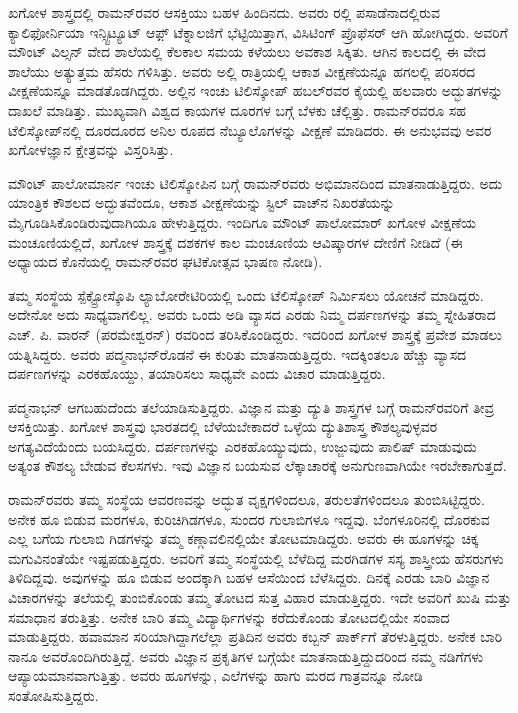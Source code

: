 ಖಗೋಳ ಶಾಸ್ತ್ರದಲ್ಲಿ ರಾಮನ್‌ರವರ ಆಸಕ್ತಿಯು ಬಹಳ ಹಿಂದಿನದು. ಅವರು  ರಲ್ಲಿ ಪಸಾಡೆನಾದಲ್ಲಿರುವ ಕ್ಯಾಲಿಫೋರ್ನಿಯಾ ಇನ್ಸ್ಟಿಟ್ಯೂಟ್ ಆಫ಼್ ಟೆಕ್ನಾಲಜಿಗೆ ಭೆಟ್ಟಿಯಿತ್ತಾಗ, ವಿಸಿಟಿಂಗ್ ಪ್ರೊಫೆಸರ್ ಆಗಿ ಹೋಗಿದ್ದರು. ಅವರಿಗೆ ಮೌಂಟ್ ವಿಲ್ಸನ್ ವೇದ ಶಾಲೆಯಲ್ಲಿ ಕೆಲಕಾಲ ಸಮಯ ಕಳೆಯಲು ಅವಕಾಶ ಸಿಕ್ಕಿತು. ಆಗಿನ ಕಾಲದಲ್ಲಿ ಈ ವೇದ ಶಾಲೆಯು ಅತ್ಯುತ್ತಮ ಹೆಸರು ಗಳಿಸಿತ್ತು. ಅವರು ಅಲ್ಲಿ ರಾತ್ರಿಯಲ್ಲಿ ಆಕಾಶ ವೀಕ್ಷಣೆಯನ್ನೂ ಹಗಲಲ್ಲಿ ಪರಿಸರದ ವೀಕ್ಷಣೆಯನ್ನೂ ಮಾಡತೊಡಗಿದ್ದರು. ಅಲ್ಲಿನ  ಇಂಚು ಟಿಲಿಸ್ಕೋಪ್ ಹಬಲ್‌ರವರ ಕೈಯಲ್ಲಿ ಹಲವಾರು ಅದ್ಭುತಗಳನ್ನು ದಾಖಲೆ ಮಾಡಿತ್ತು. ಮುಖ್ಯವಾಗಿ ವಿಶ್ವದ ಕಾಯಗಳ ದೂರಗಳ ಬಗ್ಗೆ ಬೆಳಕು ಚೆಲ್ಲಿತ್ತು. ರಾಮನ್‌ರವರೂ ಸಹ ಟೆಲಿಸ್ಕೋಪ್‌ನಲ್ಲಿ ದೂರ\enginline{-}ದೂರದ ಅನಿಲ ರೂಪದ ನೆಬ್ಯೂಲೊಗಳನ್ನು ವೀಕ್ಷಣೆ ಮಾಡಿದರು. ಈ ಅನುಭವವು ಅವರ ಖಗೋಳಜ್ಞಾನ ಕ್ಷೇತ್ರವನ್ನು ವಿಸ್ತರಿಸಿತ್ತು.

ಮೌಂಟ್ ಪಾಲೋಮಾರ್ನ  ಇಂಚು ಟಿಲಿಸ್ಕೋಪಿನ ಬಗ್ಗೆ ರಾಮನ್‌ರವರು ಅಭಿಮಾನದಿಂದ ಮಾತನಾಡುತ್ತಿದ್ದರು. ಅದು ಯಾಂತ್ರಿಕ ಕೌಶಲದ ಅದ್ಭುತವೆಂದೂ, ಆಕಾಶ ವೀಕ್ಷಣೆಯನ್ನು ಸ್ಟಿಲ್ ವಾಚ್‍ನ ನಿಖರತೆಯನ್ನು ಮೈಗೂಡಿಸಿಕೊಂಡಿರುವುದಾಗಿಯೂ ಹೇಳುತ್ತಿದ್ದರು. ಇಂದಿಗೂ ಮೌಂಟ್ ಪಾಲೋಮಾರ್ ಖಗೋಳ ವೀಕ್ಷಣೆಯ ಮಂಚೂಣಿಯಲ್ಲಿದೆ, ಖಗೋಳ ಶಾಸ್ತ್ರಕ್ಕೆ ದಶಕಗಳ ಕಾಲ ಮಂಚೂಣಿಯ ಆವಿಷ್ಕಾರಗಳ ದೇಣಿಗೆ ನೀಡಿದೆ (ಈ ಅಧ್ಯಾಯದ ಕೊನೆಯಲ್ಲಿ ರಾಮನ್‌ರವರ ಘಟಿಕೋತ್ಸವ ಭಾಷಣ ನೋಡಿ).

ತಮ್ಮ ಸಂಸ್ಥೆಯ ಸ್ಪೆಕ್ಟ್ರೋಸ್ಕೊಪಿ ಲ್ಯಾಬೋರೇಟಿರಿಯಲ್ಲಿ ಒಂದು ಟೆಲಿಸ್ಕೋಪ್ ನಿರ್ಮಿಸಲು ಯೋಚನೆ ಮಾಡಿದ್ದರು. ಅದೇನೋ ಅದು ಸಾಧ್ಯವಾಗಲಿಲ್ಲ. ಅವರು ಒಂದು ಅಡಿ ವ್ಯಾಸದ ಎರಡು ನಿಮ್ಮ ದರ್ಪಣಗಳನ್ನು ತಮ್ಮ ಸ್ನೇಹಿತರಾದ ಎಚ್. ಪಿ. ವಾರನ್ (ಪರಮೇಶ್ವರನ್) ರವರಿಂದ ತರಿಸಿಕೊಂಡಿದ್ದರು. ಇದರಿಂದ ಖಗೋಳ ಶಾಸ್ತ್ರಕ್ಕೆ ಪ್ರವೇಶ ಮಾಡಲು ಯತ್ನಿಸಿದ್ದರು. ಅವರು ಪದ್ಮನಾಭನ್‌ರೊಡನೆ ಈ ಕುರಿತು ಮಾತನಾಡುತ್ತಿದ್ದರು. ಇದಕ್ಕಿಂತಲೂ ಹೆಚ್ಚು ವ್ಯಾಸದ ದರ್ಪಣಗಳನ್ನು ಎರಕಹೊಯ್ದು, ತಯಾರಿಸಲು ಸಾಧ್ಯವೇ ಎಂದು ವಿಚಾರ ಮಾಡುತ್ತಿದ್ದರು. 

ಪದ್ಮನಾಭನ್ ಆಗಬಹುದೆಂದು ತಲೆಯಾಡಿಸುತ್ತಿದ್ದರು. ವಿಜ್ಞಾನ ಮತ್ತು ದ್ಯುತಿ ಶಾಸ್ತ್ರಗಳ ಬಗ್ಗೆ ರಾಮನ್‍ರವರಿಗೆ ತೀವ್ರ ಆಸಕ್ತಿಯಿತ್ತು. ಖಗೋಳ ಶಾಸ್ತ್ರವು ಭಾರತದಲ್ಲಿ ಬೆಳೆಯಬೇಕಾದರೆ ಒಳ್ಳೆಯ ದ್ಯುತಿಶಾಸ್ತ್ರ ಕೌಶಲ್ಯವುಳ್ಳವರ ಅಗತ್ಯವಿದೆಯೆಂದು ಬಯಸಿದ್ದರು. ದರ್ಪಣಗಳನ್ನು ಎರಕಹೊಯ್ಯುವುದು, ಉಜ್ಜುವುದು ಪಾಲಿಷ್ ಮಾಡುವುದು ಅತ್ಯಂತ ಕೌಶಲ್ಯ ಬೇಡುವ ಕೆಲಸಗಳು. ಇವು ವಿಜ್ಞಾನ ಬಯಸುವ ಲೆಕ್ಕಾಚಾರಕ್ಕೆ ಅನುಗುಣವಾಗಿಯೇ ಇರಬೇಕಾಗುತ್ತದೆ.

ರಾಮನ್‌ರವರು ತಮ್ಮ ಸಂಸ್ಥೆಯ ಆವರಣವನ್ನು ಅದ್ಭುತ ವೃಕ್ಷಗಳಿಂದಲೂ, ತರುಲತೆಗಳಿಂದಲೂ ತುಂಬಿಸಿಟ್ಟಿದ್ದರು. ಅನೇಕ ಹೂ ಬಿಡುವ ಮರಗಳೂ, ಕುರಿಚಿಗಿಡಗಳೂ, ಸುಂದರ ಗುಲಾಬಿಗಳೂ ಇದ್ದವು. ಬೆಂಗಳೂರಿನಲ್ಲಿ ದೊರಕುವ ಎಲ್ಲ ಬಗೆಯ ಗುಲಾಬಿ ಗಿಡಗಳನ್ನು ತಮ್ಮ ಕಣ್ಗಾವಲಿನಲ್ಲಿಯೇ ತೋಟಮಾಡಿದ್ದರು. ಅವರು ಈ ಹೂಗಳನ್ನು ಚಿಕ್ಕ ಮಗುವಿನಂತೆಯೇ ಇಷ್ಟಪಡುತ್ತಿದ್ದರು. ಅವರಿಗೆ ತಮ್ಮ ಸಂಸ್ಥೆಯಲ್ಲಿ ಬೆಳೆದಿದ್ದ ಮರಗಿಡಗಳ ಸಸ್ಯ ಶಾಸ್ತ್ರೀಯ ಹೆಸರುಗಳು ತಿಳಿದಿದ್ದವು. ಅವುಗಳನ್ನು ಹೂ ಬಿಡುವ ಅಂದಕ್ಕಾಗಿ ಬಹಳ ಆಸೆಯಿಂದ ಬೆಳೆಸಿದ್ದರು. ದಿನಕ್ಕೆ ಎರಡು ಬಾರಿ ವಿಜ್ಞಾನ ವಿಚಾರಗಳನ್ನು ತಲೆಯಲ್ಲಿ ತುಂಬಿಕೊಂಡು ತಮ್ಮ ತೋಟದ ಸುತ್ತ ವಿಹಾರ ಮಾಡುತ್ತಿದ್ದರು. ಇದೇ ಅವರಿಗೆ ಖುಷಿ ಮತ್ತು ಸಮಾಧಾನ ತರುತ್ತಿತ್ತು. ಅನೇಕ ಬಾರಿ ತಮ್ಮ ವಿದ್ಯಾರ್ಥಿಗಳನ್ನು ಕರೆದುಕೊಂಡು ತೋಟದಲ್ಲಿಯೇ ಸಂವಾದ ಮಾಡುತ್ತಿದ್ದರು. ಹವಾಮಾನ ಸರಿಯಾಗಿದ್ದಾಗಲೆಲ್ಲಾ ಪ್ರತಿದಿನ ಅವರು ಕಬ್ಬನ್ ಪಾರ್ಕ್‌ಗೆ ತೆರಳುತ್ತಿದ್ದರು. ಅನೇಕ ಬಾರಿ ನಾನೂ ಅವರೊಂದಿಗಿರುತ್ತಿದ್ದೆ. ಅವರು ವಿಜ್ಞಾನ ಪ್ರಕೃತಿಗಳ ಬಗ್ಗೆಯೇ ಮಾತನಾಡುತ್ತಿದ್ದುದರಿಂದ ನಮ್ಮ ನಡಿಗೆಗಳು ಆಪ್ಯಾಯಮಾನವಾಗುತ್ತಿತ್ತು. ಅವರು ಹೂಗಳನ್ನು, ಎಲೆಗಳನ್ನು ಹಾಗು ಮರದ ಗಾತ್ರವನ್ನೂ ನೋಡಿ ಸಂತೋಷಿಸುತ್ತಿದ್ದರು. 


